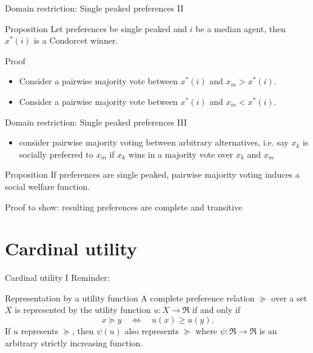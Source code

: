 \documentclass[bigger]{beamer}
\begin{document}
\begin{frame}[label={sec:org8fb7ead}]{Domain restriction: Single peaked preferences II}
\begin{block}{Proposition}
Let preferences be single peaked and \(i\) be a median agent, then \(x^*(i)\) is a Condorcet winner.
\end{block}
\begin{block}{Proof}
\begin{itemize}
\item Consider a pairwise majority vote between \(x^*(i)\) and \(x_m>x^*(i)\).

\vspace*{1.5cm}
\item Consider a pairwise majority vote between \(x^*(i)\) and \(x_m<x^*(i)\).

\vspace*{1.5cm}
\end{itemize}
\end{block}
\end{frame}
\begin{frame}[label={sec:org9930e0f}]{Domain restriction: Single peaked preferences III}
\begin{itemize}
\item consider pairwise majority voting between arbitrary alternatives, i.e. say \(x_k\) is socially preferred to \(x_m\) if \(x_k\) wins in a majority vote over \(x_k\) and \(x_m\)
\end{itemize}
\begin{block}{Proposition}
If preferences are single peaked, pairwise majority voting induces a social welfare function.
\end{block}
\begin{block}{Proof}
to show: resulting preferences are complete and transitive

\vspace*{2cm}
\end{block}
\end{frame}

\section{Cardinal utility}
\label{sec:orgb937a82}
\begin{frame}[label={sec:org1bdfdb0}]{Cardinal utility I}
Reminder:
\begin{block}{Representation by a utility function}
A complete preference relation \(\succeq\) over a set \(X\) is represented by the utility function \(u:X\rightarrow\Re\) if and only if
$$x\succeq y \quad\Leftrightarrow\quad u(x)\geq u(y).$$
If \(u\) represents \(\succeq\), then \(\psi(u)\) also represents \(\succeq\) where \(\psi:\Re\rightarrow\Re\) is an arbitrary strictly increasing function.
\end{block}
\end{frame}
\end{document}
